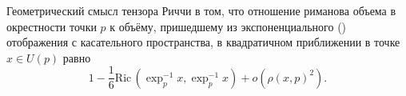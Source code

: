 Геометрический смысл тензора Риччи в том, что отношение риманова объема в окрестности точки $p$ к объёму, пришедшему из экспоненциального () отображения с касательного пространства, в квадратичном приближении в точке $x \in U(p)$ равно
\begin{equation*}
    1 - \frac{1}{6} \text{Ric}\, \left(
        \exp^{-1}_p x, \exp^{-1}_p x
    \right) + o(\rho(x,p)^2).
\end{equation*}
